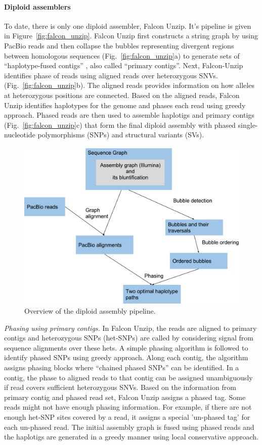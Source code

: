 \paragraph{Diploid assemblers}
To date, there is only one diploid assembler, Falcon Unzip. It's pipeline is given in Figure~\ref{fig:falcon_unzip}.
Falcon Unzip first constructs a string graph by using PacBio reads and then collapse the bubbles representing divergent regions between homologous sequences (Fig.~\ref{fig:falcon_unzip}a) to generate sets of ``haplotype-fused contigs'' , also called ``primary contigs''. 
Next, Falcon-Unzip identifies phase of reads using aligned reads over heterozygous SNVs. (Fig.~\ref{fig:falcon_unzip}b). 
The aligned reads provides information on how alleles at heterozygous positions are connected. Based on the aligned reads, Falcon Unzip identifies haplotypes for the genome and phases each read using greedy approach.
Phased reads are then used to assemble haplotigs and primary contigs (Fig.~\ref{fig:falcon_unzip}c) 
that form the final diploid assembly with phased single-nucleotide polymorphisms (SNPs) and structural variants (SVs).
\begin{figure}[t!]\centering
\includegraphics[width=.8\columnwidth]{pipeline.pdf}
\caption{Overview of the diploid assembly pipeline. }
\label{fig:pipeline}
\end{figure}

\textit{Phasing using primary contigs.}
In Falcon Unzip, the reads are aligned to primary contigs and heterozygous SNPs (het-SNPs) are called by considering signal from sequence alignments over these hets.
A simple phasing algorithm is followed to identify phased SNPs using greedy approach. 
Along each contig, the algorithm assigns phasing blocks where ``chained phased SNPs'' can be identified. 
In a contig, the phase to aligned reads to that contig can be assigned unambiguously if read covers sufficient heterozygous SNVs.
Based on the information from primary contig and phased read set, Falcon Unzip assigns a phased tag.
Some reads might not have enough phasing information. For example, if there are not enough het-SNP sites covered by a read, it assigns a special 'un-phased tag' for each un-phased read.
The initial assembly graph is fused using phased reads and the haplotigs are generated in a greedy manner using local conservative approach.

